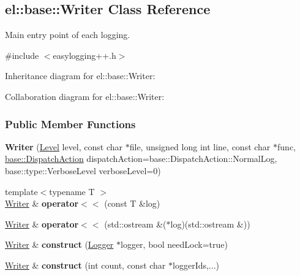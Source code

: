 \hypertarget{a00097}{}\subsection{el\+:\+:base\+:\+:Writer Class Reference}
\label{a00097}


Main entry point of each logging.  




{\ttfamily \#include $<$easylogging++.\+h$>$}



Inheritance diagram for el\+:\+:base\+:\+:Writer\+:


Collaboration diagram for el\+:\+:base\+:\+:Writer\+:
\subsubsection*{Public Member Functions}
\begin{DoxyCompactItemize}
\item 
\hypertarget{a00097_ac2a835925f37fd2ca3da00998d8a533c}{}{\bfseries Writer} (\hyperlink{a00183_ab0ac6091262344c52dd2d3ad099e8e36}{Level} level, const char $\ast$file, unsigned long int line, const char $\ast$func, \hyperlink{a00184_a3aa2563d38e47388ba242a1694fc2839}{base\+::\+Dispatch\+Action} dispatch\+Action=base\+::\+Dispatch\+Action\+::\+Normal\+Log, base\+::type\+::\+Verbose\+Level verbose\+Level=0)\label{a00097_ac2a835925f37fd2ca3da00998d8a533c}

\item 
\hypertarget{a00097_ab94f0d920c6465a57937e893aa9f5ada}{}{\footnotesize template$<$typename T $>$ }\\\hyperlink{a00097}{Writer} \& {\bfseries operator$<$$<$} (const T \&log)\label{a00097_ab94f0d920c6465a57937e893aa9f5ada}

\item 
\hypertarget{a00097_aea6d7f996ff92e9485a76ad3955f0a29}{}\hyperlink{a00097}{Writer} \& {\bfseries operator$<$$<$} (std\+::ostream \&($\ast$log)(std\+::ostream \&))\label{a00097_aea6d7f996ff92e9485a76ad3955f0a29}

\item 
\hypertarget{a00097_a282d82f392a3e6fef9eda47ce53e87dc}{}\hyperlink{a00097}{Writer} \& {\bfseries construct} (\hyperlink{a00048}{Logger} $\ast$logger, bool need\+Lock=true)\label{a00097_a282d82f392a3e6fef9eda47ce53e87dc}

\item 
\hypertarget{a00097_ab2bc960787eb3c9b01569629dcbeb246}{}\hyperlink{a00097}{Writer} \& {\bfseries construct} (int count, const char $\ast$logger\+Ids,...)\label{a00097_ab2bc960787eb3c9b01569629dcbeb246}

\end{DoxyCompactItemize}
